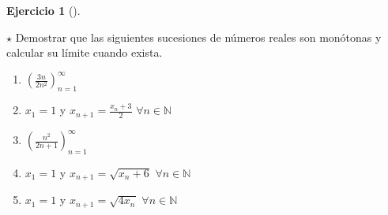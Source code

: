 \documentclass[
  a4paper,
]{scrreport}
\theoremstyle{definition}
\newtheorem{exercise}{Ejercicio}[chapter]
\theoremstyle{remark}
\begin{document}
\leavevmode{}%
\begin{exercise}[]\label{exr-sucesiones-monotonas}

\(\star\) Demostrar que las siguientes sucesiones de números reales son
monótonas y calcular su límite cuando exista.

\begin{enumerate}
\def\labelenumi{\alph{enumi}.}
\item
  \(\left(\frac{3n}{2n^2}\right)_{n=1}^\infty\)
\item
  \(x_1=1\) y \(x_{n+1}=\frac{x_n+3}{2}\) \(\forall n \in \mathbb{N}\)
\item
  \(\left(\frac{n^2}{2n+1}\right)_{n=1}^\infty\)
\item
  \(x_1=1\) y \(x_{n+1}=\sqrt{x_n+6}\) \(\forall n\in \mathbb{N}\)
\item
  \(x_1=1\) y \(x_{n+1}=\sqrt{4x_n}\) \(\forall n\in\mathbb{N}\)
\end{enumerate}

\end{exercise}
\end{document}
